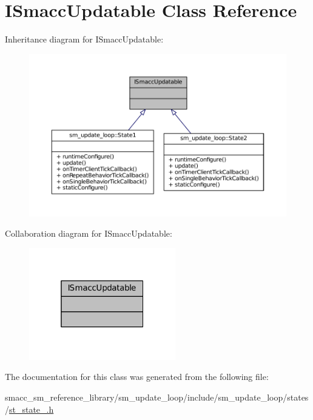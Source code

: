 \hypertarget{classISmaccUpdatable}{}\section{I\+Smacc\+Updatable Class Reference}
\label{classISmaccUpdatable}


Inheritance diagram for I\+Smacc\+Updatable\+:
\nopagebreak
\begin{figure}[H]
\begin{center}
\leavevmode
\includegraphics[width=350pt]{classISmaccUpdatable__inherit__graph}
\end{center}
\end{figure}


Collaboration diagram for I\+Smacc\+Updatable\+:
\nopagebreak
\begin{figure}[H]
\begin{center}
\leavevmode
\includegraphics[width=181pt]{classISmaccUpdatable__coll__graph}
\end{center}
\end{figure}


The documentation for this class was generated from the following file\+:\begin{DoxyCompactItemize}
\item 
smacc\+\_\+sm\+\_\+reference\+\_\+library/sm\+\_\+update\+\_\+loop/include/sm\+\_\+update\+\_\+loop/states/\hyperlink{sm__update__loop_2include_2sm__update__loop_2states_2st__state__1_8h}{st\+\_\+state\+\_.\+h}\end{DoxyCompactItemize}

